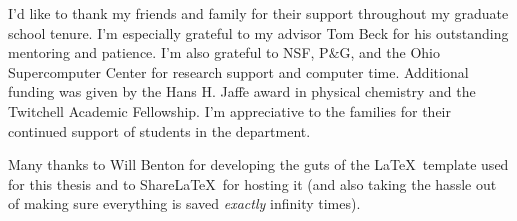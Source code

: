 I'd like to thank my friends and family for their support throughout my graduate school tenure. I'm especially grateful to my advisor Tom Beck for his 
outstanding mentoring and patience. I'm also grateful to NSF, P$\&$G, and the Ohio Supercomputer Center for research support and computer time. 
Additional funding was given by the Hans H. Jaff$\acute{\mathrm{e}}$ award in physical chemistry and the Twitchell Academic Fellowship. I'm appreciative
to the families for their continued support of students in the department.

Many thanks to Will Benton for developing the guts of the \LaTeX~template used for this thesis and to Share\LaTeX~for hosting it (and also taking the 
hassle out of making sure everything is saved \emph{exactly} infinity times).
